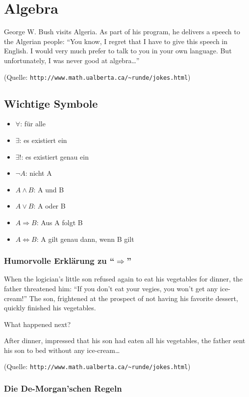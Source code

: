 \documentclass[10pt]{scrbook}
\begin{document}
\chapter{Algebra}

George W. Bush visits Algeria. As part of his program, he delivers a speech to the Algerian people: "`You know, I regret that I have to give this speech in English. I would very much prefer to talk to you in your own language. But unfortunately, I was never good at algebra\ldots"'

(Quelle: \verb|http://www.math.ualberta.ca/~runde/jokes.html|)

\section{Wichtige Symbole}
\begin{itemize}
	\item $\forall$: für alle
	\item $\exists$: es existiert ein
	\item $\exists !$: es existiert genau ein
	\item $\neg A$: nicht A
	\item $A \wedge B$: A und B
	\item $A \vee B$: A oder B
	\item $A \Rightarrow B$: Aus A folgt B
	\item $A \Leftrightarrow B$: A gilt genau dann, wenn B gilt
\end{itemize}

\subsection{Humorvolle Erklärung zu "`$\Rightarrow$"'}

When the logician's little son refused again to eat his vegetables for dinner, the father threatened him: "`If you don't eat your vegies, you won't get any ice-cream!"'
The son, frightened at the prospect of not having his favorite dessert, quickly finished his vegetables.

What happened next?

After dinner, impressed that his son had eaten all his vegetables, the father sent his son to bed without any ice-cream\ldots

(Quelle: \verb|http://www.math.ualberta.ca/~runde/jokes.html|)

\subsection{Die De-Morgan'schen Regeln}
\end{document}
